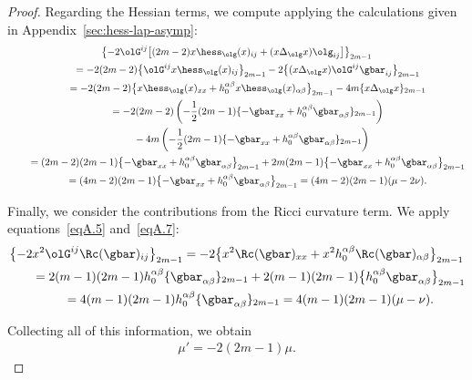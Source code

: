 \begin{proof}
Regarding the Hessian terms, we compute applying the calculations given in Appendix~\ref{sec:hess-lap-asymp}:
\begin{gather*}%
\big\{{-}2 \olG^{ij}\big[ (2m-2) x\hess_{\olg} (x)_{ij} +(x\Delta_{\olg} x) \olg_{ij} \big]\big\}_{2m-1} \\
\qquad{} = -2 (2m-2) \big\{ \olG^{ij} x\hess_{\olg} (x)_{ij}\big\}_{2m-1} -2 \big\{ (x\Delta_{\olg} x) \olG^{ij} \gbar_{ij}\big\}_{2m-1}\\
\qquad{} = -2 (2m-2) \big\{ x\hess_{\olg} (x)_{xx} + h_0^{\alpha \beta} x\hess_{\olg} (x)_{\alpha \beta}\big\}_{2m-1} -4m \{ x\Delta_{\olg} x\}_{2m-1} \\
\qquad{} = -2( 2m-2) \left( -\frac{1}{2} (2m-1) \{ -\gbar_{xx}+h^{\alpha \beta}_0 \gbar_{\alpha \beta} \}_{2m-1}\right) \\
\qquad \quad{}- 4m \left(-\frac{1}{2} (2m-1) \{ -\gbar_{xx} + h^{\alpha \beta}_0 \gbar_{\alpha \beta} \}_{2m-1}\right) \\
\qquad{}= ( 2m-2) (2m-1) \big\{ {-}\gbar_{xx}+h^{\alpha \beta}_0 \gbar_{\alpha \beta} \big\}_{2m-1}+ 2m (2m-1) \big\{ {-}\gbar_{xx} + h^{\alpha \beta}_0 \gbar_{\alpha \beta} \big\}_{2m-1} \\
\qquad{}= ( 4m-2) (2m-1) \big\{ {-}\gbar_{xx}+h^{\alpha \beta}_0 \gbar_{\alpha \beta} \big\}_{2m-1} = (4m-2)(2m-1) (\mu - 2\nu).
\end{gather*}

Finally, we consider the contributions from the Ricci curvature term. We apply equations~\eqref{eqA.5} and~\eqref{eqA.7}:
\begin{gather*}%
\big\{{-}2 x^2\olG^{ij}\Rc(\gbar)_{ij}\big\}_{2m-1} = -2 \big\{ x^2 \Rc(\gbar)_{xx} + x^2 h^{\alpha \beta}_0 \Rc(\gbar)_{\alpha \beta} \big\}_{2m-1} \\
\qquad {} = 2(m-1)(2m-1) h^{\alpha \beta}_0 \{\gbar_{\alpha \beta}\}_{2m-1} + 2(m-1)(2m-1) \big\{ h^{\alpha \beta}_0\gbar_{\alpha \beta}\big\}_{2m-1}\\
\qquad{} = 4(m-1)(2m-1) h^{\alpha \beta}_0 \{\gbar_{\alpha \beta}\}_{2m-1} = 4(m-1)(2m-1) (\mu - \nu).
\end{gather*}

Collecting all of this information, we obtain
\begin{gather*}%
\mu' = -2 (2m-1) \mu.
\end{gather*}


\end{proof}

